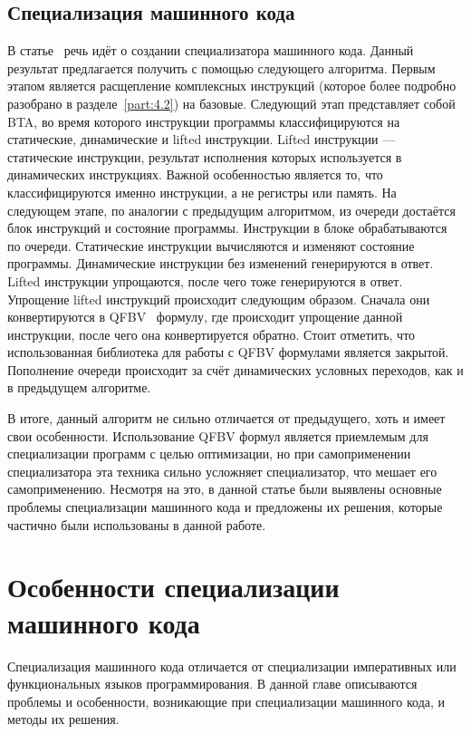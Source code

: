 \subsection{Специализация машинного кода}
В статье~\cite{PEMC} речь идёт о создании специализатора машинного кода. Данный результат предлагается получить с помощью следующего алгоритма. Первым этапом является расщепление комплексных инструкций (которое более подробно разобрано в разделе~\ref{part:4.2}) на базовые. Следующий этап представляет собой BTA, во время которого инструкции программы классифицируются на статические, динамические и lifted инструкции. Lifted инструкции --- статические инструкции, результат исполнения которых используется в динамических инструкциях. Важной особенностью является то, что классифицируются именно инструкции, а не регистры или память. На следующем этапе, по аналогии с предыдущим алгоритмом, из очереди достаётся блок инструкций и состояние программы. Инструкции в блоке обрабатываются по очереди. Статические инструкции вычисляются и изменяют состояние программы. Динамические инструкции без изменений генерируются в ответ. Lifted инструкции упрощаются, после чего тоже генерируются в ответ. Упрощение lifted инструкций происходит следующим образом. Сначала они конвертируются в QFBV~\cite{QFBV} формулу, где происходит упрощение данной инструкции, после чего она конвертируется обратно. Стоит отметить, что использованная библиотека для работы с QFBV формулами является закрытой. Пополнение очереди происходит за счёт динамических условных переходов, как и в предыдущем алгоритме.

В итоге, данный алгоритм не сильно отличается от предыдущего, хоть и имеет свои особенности. Использование QFBV формул является приемлемым для специализации программ с целью оптимизации, но при самоприменении специализатора эта техника сильно усложняет специализатор, что мешает его самоприменению. Несмотря на это, в данной статье были выявлены основные проблемы специализации машинного кода и предложены их решения, которые частично были использованы в данной работе. 

\section{Особенности специализации машинного кода}

Специализация машинного кода отличается от специализации императивных или функциональных языков программирования.
В данной главе описываются проблемы и особенности, возникающие при специализации машинного кода, и методы их решения.

